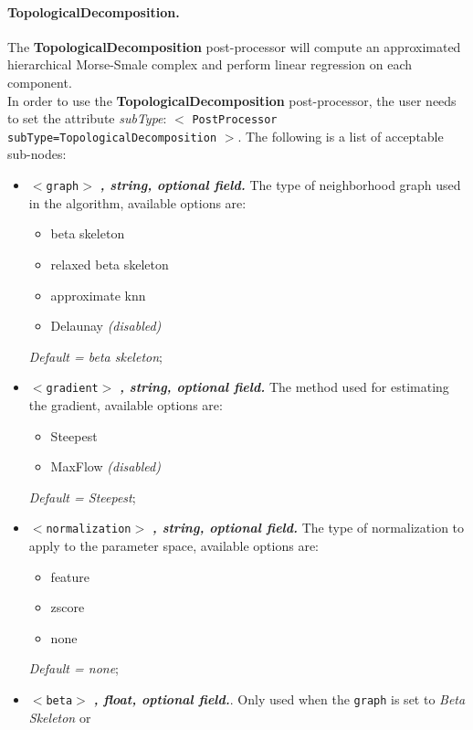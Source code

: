 \paragraph{TopologicalDecomposition.}
\label{TopologicalDecomposition}
The \textbf{TopologicalDecomposition} post-processor will compute an 
approximated hierarchical Morse-Smale complex and perform linear regression on
each component. 
\\In order to use the \textbf{TopologicalDecomposition} post-processor, the user
needs to set the attribute \textit{subType}: 
$<$ \texttt{PostProcessor subType=TopologicalDecomposition} $>$. 
The following is a list of acceptable sub-nodes:
\begin{itemize}
  \item $<$\texttt{graph}$>$ \textbf{\textit{, string, optional field.}} The 
        type of neighborhood graph used in the algorithm, available options are:
        \begin{itemize}
          \item beta skeleton
          \item relaxed beta skeleton
          \item approximate knn
          \item Delaunay \textit{(disabled)}
        \end{itemize}
        \textit{Default = beta skeleton};
  \item $<$\texttt{gradient}$>$ \textbf{\textit{, string, optional field.}} The 
        method used for estimating the gradient, available options are:
        \begin{itemize}
          \item Steepest
          \item MaxFlow \textit{(disabled)}
        \end{itemize}
        \textit{Default = Steepest};
  \item $<$\texttt{normalization}$>$ \textbf{\textit{, string, optional field.}}
      The type of normalization to apply to the parameter space, available
      options are:
        \begin{itemize}
          \item feature
          \item zscore
          \item none
        \end{itemize}
        \textit{Default = none};
  \item $<$\texttt{beta}$>$ \textbf{\textit{, float, optional field.}}. Only 
        used when the \texttt{graph} is set to \textit{Beta Skeleton} or 

\end{itemize}
